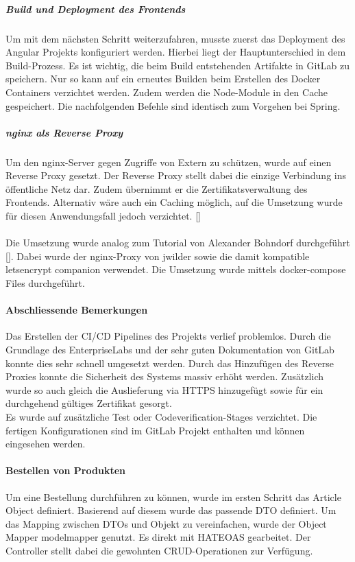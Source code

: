 \subparagraph{Build und Deployment des Frontends}
Um mit dem nächsten Schritt weiterzufahren, musste zuerst das Deployment des Angular Projekts konfiguriert werden. Hierbei liegt der Hauptunterschied in dem Build-Prozess. Es ist  wichtig, die beim Build entstehenden Artifakte in GitLab zu speichern. Nur so kann auf ein erneutes Builden beim Erstellen des Docker Containers verzichtet werden. Zudem werden die Node-Module in den Cache gespeichert. Die nachfolgenden Befehle sind identisch zum Vorgehen bei Spring.  

\subparagraph{nginx als Reverse Proxy}\label{reverseProxy}
Um den nginx-Server gegen Zugriffe von Extern zu schützen, wurde auf einen Reverse Proxy gesetzt. Der Reverse Proxy stellt dabei die einzige Verbindung ins öffentliche Netz dar. Zudem übernimmt er die Zertifikatsverwaltung des Frontends. Alternativ wäre auch ein Caching möglich, auf die Umsetzung wurde für diesen Anwendungsfall jedoch verzichtet. [\cite{reverseProxy}] \\\\

Die Umsetzung wurde analog zum Tutorial von Alexander Bohndorf durchgeführt [\cite{confReverseProxy}]. Dabei wurde der \gls{nginx}-Proxy von jwilder sowie die damit kompatible letsencrypt companion verwendet. Die Umsetzung wurde mittels docker-compose Files durchgeführt. 

\paragraph{Abschliessende Bemerkungen}
Das Erstellen der CI/CD Pipelines des Projekts verlief problemlos. Durch die Grundlage des \gls{EnterpriseLab}s und der sehr guten Dokumentation von \gls{GitLab} konnte dies sehr schnell umgesetzt werden. Durch das Hinzufügen des Reverse Proxies konnte die Sicherheit des Systems massiv erhöht werden. Zusätzlich wurde so auch gleich die Auslieferung via HTTPS hinzugefügt sowie für ein durchgehend gültiges Zertifikat gesorgt. \\
Es wurde auf zusätzliche Test oder Codeverification-Stages verzichtet. 
Die fertigen Konfigurationen sind im \gls{GitLab} Projekt enthalten und können eingesehen werden. 

\paragraph{Bestellen von Produkten}\label{order}
Um eine Bestellung durchführen zu können, wurde im ersten Schritt das Article Object definiert. Basierend auf diesem wurde das passende \ac{DTO} definiert. Um das Mapping zwischen DTOs und Objekt zu vereinfachen, wurde der Object Mapper modelmapper genutzt. 
Es direkt mit \ac{HATEOAS} gearbeitet. Der Controller stellt dabei die gewohnten CRUD-Operationen zur Verfügung. \\

